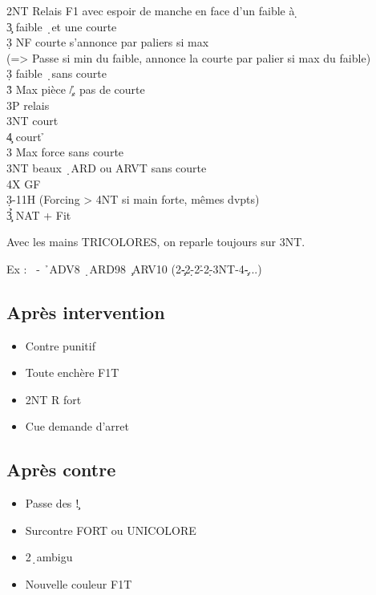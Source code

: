 \documentclass[a4paper]{article}
\begin{document}
\begin{bidtable}
2NT \> Relais F1 avec espoir de manche en face d’un faible à \d \+\\
3\c \> faible \d\ et une courte\+\\
3\d \> NF courte s’annonce par paliers si max\\
\>(=> Passe si min du faible, annonce la courte par palier si max du faible)\-\\
3\d \> faible \d\ sans courte\\
3\h \> Max pièce \c /\h , pas de courte\+\\
3P \> relais\+\\
3NT \> court \c \\
4\c \> court \h \-\-\\
3\s \> Max force sans courte\\
3NT \> beaux \d\ ARD ou ARVT sans courte\\
4X \> GF\-\\
3\d {}-11H (Forcing > 4NT si main forte, mêmes dvpts)\\
3\h{}\c \> NAT + Fit\-
\end{bidtable}

Avec les mains TRICOLORES, on reparle toujours sur 3NT.

Ex : \s\ - \h\ ADV8 \d\ ARD98 \c\ ARV10
(2\c -2\d -2\h -2\d -3NT-4\c -...)

\subsection{Après intervention}

\begin{itemize}
\item Contre punitif

\item Toute enchère F1T

\item 2NT R fort

\item Cue demande d'arret

\end{itemize}

\subsection{Après contre}

\begin{itemize}
\item Passe des \c !

\item Surcontre FORT ou UNICOLORE

\item 2\d\ ambigu

\item Nouvelle couleur F1T

\end{itemize}
\end{document}
